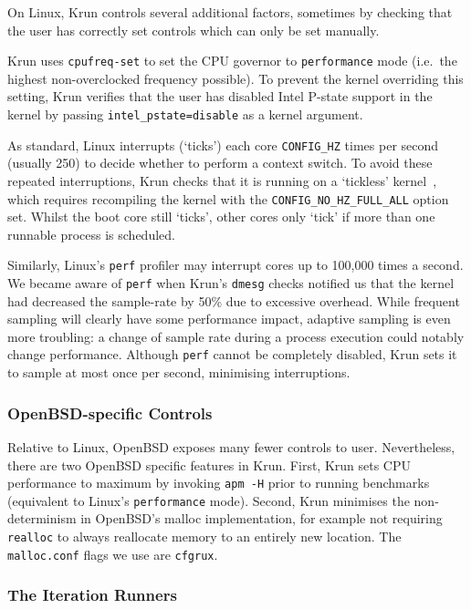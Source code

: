 \documentclass[acmsmall]{acmart}\settopmatter{printfolios=true}
\newcommand{\krun}{Krun\xspace}
\begin{document}
On Linux, \krun controls several additional factors, sometimes by checking that
the user has correctly set controls which can only be set manually.

\krun uses \texttt{cpufreq-set} to set the CPU governor to \texttt{performance} mode
(i.e.~the highest non-overclocked frequency possible).
To prevent the kernel overriding this setting, \krun verifies that the user has disabled
Intel P-state support in the kernel by passing
\texttt{intel\_pstate=disable} as a kernel argument.

As standard, Linux interrupts (`ticks') each core
\texttt{CONFIG\-\_HZ} times per second (usually 250) to
decide whether to perform a context switch. To avoid these repeated
interruptions, \krun checks that it is running on a `tickless'
kernel~\cite{tickless}, which requires recompiling the kernel with the
\texttt{CONFIG\_NO\_HZ\_FULL\_ALL} option set. Whilst the boot core still
`ticks', other cores only `tick' if more than one runnable process is scheduled.

Similarly, Linux's \texttt{perf} profiler may interrupt cores up to 100,000 times a
second. We became aware of \texttt{perf} when \krun's \texttt{dmesg} checks
notified us that the kernel had decreased the sample-rate by
50\% due to excessive overhead. While frequent sampling will clearly have some performance
impact, adaptive sampling is even more troubling: a change of sample
rate during a process execution could notably change performance.
Although \texttt{perf} cannot be completely disabled, \krun sets it to sample at most
once per second, minimising interruptions.


\subsubsection{OpenBSD-specific Controls}

Relative to Linux, OpenBSD exposes many fewer controls to user. Nevertheless,
there are two OpenBSD specific features in \krun.
First, \krun sets CPU performance to maximum by invoking \texttt{apm -H} prior
to running benchmarks (equivalent to Linux's \texttt{performance} mode).
Second, \krun minimises the non-determinism in OpenBSD's malloc implementation,
for example not requiring \texttt{realloc} to always reallocate memory to
an entirely new location. The \texttt{malloc.conf} flags we use are \texttt{cfgrux}.


\subsubsection{The Iteration Runners}
\end{document}
